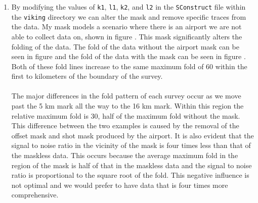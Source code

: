 \begin{enumerate}
\item By modifying the values of \texttt{k1}, \texttt{l1}, \texttt{k2}, and \texttt{l2} in the \texttt{SConstruct} file within the \texttt{viking} directory we can alter the mask and remove specific traces from the data. My mask models a scenario where there is an airport we are not able to collect data on, shown in figure . This mask significantly alters the folding of the data. The fold of the data without the airport mask can be seen in figure  and the fold of the data with the mask can be seen in figure . Both of these fold lines increase to the same maximum fold of 60 within the first to kilometers of the boundary of the survey. \\ \\The major differences in the fold pattern of each survey occur as we move past the 5 km mark all the way to the 16 km mark. Within this region the relative maximum fold is 30, half of the maximum fold without the mask. This difference between the two examples is caused by the removal of the offset mask and shot mask produced by the airport. It is also evident that the signal to noise ratio in the vicinity of the mask is four times less than that of the maskless data. This occurs because the average maximum fold in the region of the mask is half of that in the maskless data and the signal to noise ratio is proportional to the square root of the fold.  This negative influence is not optimal and we would prefer to have data that is four times more comprehensive. 



\end{enumerate}
